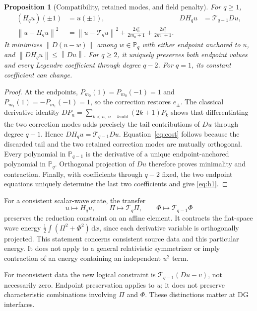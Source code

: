 \documentclass[11pt,a4paper]{article}
\newtheorem{proposition}[theorem]{Proposition}
\theoremstyle{remark}\newtheorem{remark}[theorem]{Remark}
\newcommand{\norm}[1]{\left\lVert #1\right\rVert}
\newcommand{\Pq}{\mathbb{P}_q}
\newcommand{\dd}{\,\mathrm{d}}
\newcommand{\T}{\mathcal{T}}
\begin{document}
\begin{proposition}[Compatibility, retained modes, and field penalty]
\label{prop:h1}
For \(q\ge1\),
\begin{align}
 (H_q u)(\pm1)&=u(\pm1), &D H_q u&=\T_{q-1}Du,
 \label{eq:h1properties}\\
 \norm{u-H_q u}^2
 &=\norm{u-\T_q u}^2+
 \frac{2s_0^2}{2m_0+1}+\frac{2s_1^2}{2m_1+1}.
 \label{eq:cost}
\end{align}
It minimizes \(\norm{D(u-w)}\) among \(w\in\Pq\) with either endpoint
anchored to \(u\), and \(\norm{D H_q u}\le\norm{Du}\).
For \(q\ge2\), it uniquely preserves both endpoint values and every
Legendre coefficient through degree \(q-2\). For \(q=1\), its constant
coefficient can change.
\end{proposition}
\begin{proof}
At the endpoints, \(P_{m_0}(1)=P_{m_0}(-1)=1\) and
\(P_{m_1}(1)=-P_{m_1}(-1)=1\), so the correction restores \(e_\pm\).
The classical derivative identity
\(DP_n=\sum_{k<n,\ n-k\ \mathrm{odd}}(2k+1)P_k\)
\cite{dlmf,rapisarda2024} shows that differentiating the two correction
modes adds precisely the tail contributions of \(Du\) through degree
\(q-1\). Hence \(D H_q u=\T_{q-1}Du\).
Equation~\eqref{eq:cost} follows because the discarded tail and the two
retained correction modes are mutually orthogonal. Every polynomial in
\(\mathbb P_{q-1}\) is the derivative of a unique endpoint-anchored
polynomial in \(\Pq\). Orthogonal projection of \(Du\) therefore proves
minimality and contraction. Finally, with coefficients through \(q-2\)
fixed, the two endpoint equations uniquely determine the last two
coefficients and give \eqref{eq:h1}.
\end{proof}

For a consistent scalar-wave state, the transfer
\begin{equation}
 u\mapsto H_q u,\qquad \Pi\mapsto\T_q\Pi,\qquad
 \Phi\mapsto\T_{q-1}\Phi
 \label{eq:compatibletransfer}
\end{equation}
preserves the reduction constraint on an affine element. It contracts the
flat-space wave energy \(\tfrac12\int(\Pi^2+\Phi^2)\dd x\), since each
derivative variable is orthogonally projected. This statement concerns
consistent source data and this particular energy. It does not apply to a
general relativistic symmetrizer or imply contraction of an energy containing
an independent \(u^2\) term.

For inconsistent data the new logical constraint is
\(\T_{q-1}(Du-v)\), not necessarily zero. Endpoint preservation applies
to \(u\); it does not preserve characteristic combinations involving
\(\Pi\) and \(\Phi\). These distinctions matter at DG interfaces.
\end{document}
